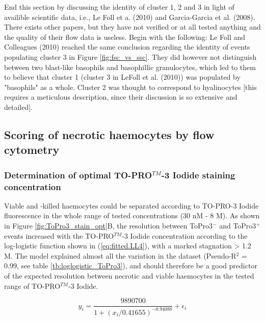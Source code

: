 End this section by discussing the identity of cluster 1, 2 and 3 in light of availible scientific data, i.e., Le Foll et a. (2010) and Garcia-Garcia et al. (2008). There exists other papers, but they have not verified or at all tested anything and the quality of their flow data is useless. Begin with the following: Le Foll and Colleagues (2010) reached the same conclusion regarding the identity of events populating cluster 3 in Figure \ref{fig:fsc_vs_ssc}. They did however not distinguish between two blast-like basophils and basophillic granulocytes, which led to them to believe that cluster 1 (cluster 3 in LeFoll et al. (2010)) was populated by "basophils" as a whole. Cluster 2 was thought to correspond to hyalinocytes [this requires a meticulous description, since their discussion is so extensive and detailed].

\subsection{Scoring of necrotic haemocytes by flow cytometry}
\subsubsection{Determination of optimal TO-PRO$^{TM}$-3 Iodide staining concentration}
Viable and -killed haemocytes could be separated according to TO-PRO-3 Iodide fluorescence in the whole range of tested concentrations (30 nM - 8 \micro M). As shown in Figure \ref{fig:ToPro3_stain_opt}B, the resolution between ToPro3$^{-}$ and ToPro3$^{+}$ events increased with the TO-PRO$^{TM}$-3 Iodide concentration according to the log-logistic function shown in (\ref{eq:fitted.LL4}), with a marked stagnation > 1.2 \micro M. The model explained almost all the variation in the dataset (Pseudo-R$^{2}$ = 0.99, see table \ref{tb:loglogistic_ToPro3}), and should therefore be a good predictor of the expected resolution between necrotic and viable haemocytes in the tested range of TO-PRO$^{TM}$-3 Iodide.

\begin{equation}
\label{eq:fitted.LL4}
y_{i} = \dfrac{9890700}{1 + (x_i / 0.41655)^{-0.94088}} + \epsilon_i
\end{equation}

